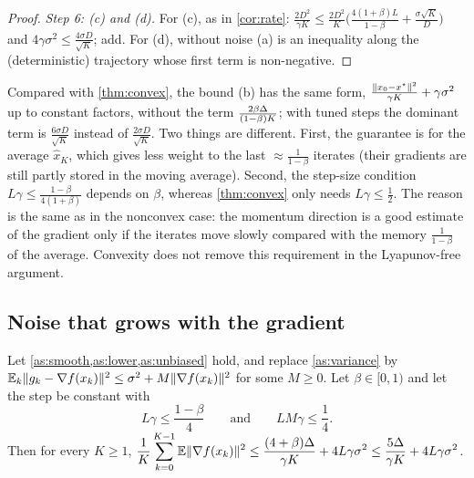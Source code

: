 \begin{proof}
\emph{Step 6: (c) and (d).} For (c), as in \cref{cor:rate}:
$\frac{2D^2}{\gamma K}\le\frac{2D^2}{K}\bigl(\frac{4(1+\beta)L}{1-\beta}+\frac{\sigma\sqrt K}{D}\bigr)$ and
$4\gamma\sigma^2\le\frac{4\sigma D}{\sqrt K}$; add. For (d), without noise (a) is an inequality
along the (deterministic) trajectory whose first term is non-negative.
\end{proof}

Compared with \cref{thm:convex}, the bound (b) has the same form,
$\frac{\lVert x_0-x^\star\rVert^2}{\gamma K}+\gamma\sigma^2$ up to constant factors, without the term
$\frac{2\beta\Delta}{(1-\beta)K}$; with tuned steps the dominant term is $\frac{6\sigma D}{\sqrt K}$
instead of $\frac{2\sigma D}{\sqrt K}$. Two things are different. First, the guarantee is for the
average $\hat x_K$, which gives less weight to the last $\approx\frac1{1-\beta}$ iterates
(their gradients are still partly stored in the moving average). Second, the step-size
condition $L\gamma\le\frac{1-\beta}{4(1+\beta)}$ depends on $\beta$, whereas \cref{thm:convex}
only needs $L\gamma\le\frac12$. The reason is the same as in the nonconvex case: the momentum
direction is a good estimate of the gradient only if the iterates move slowly compared with
the memory $\frac1{1-\beta}$ of the average. Convexity does not remove this requirement in
the Lyapunov-free argument.

\subsection{Noise that grows with the gradient}\label{sec:lf-growing}

\begin{proposition}\label{prop:lf-growing}
Let \cref{as:smooth,as:lower,as:unbiased} hold, and replace \cref{as:variance} by
$\mathbb{E}_k\lVert g_k-\nabla f(x_k)\rVert^2\le\sigma^2+M\lVert \nabla f(x_k)\rVert^2$ for some $M\ge0$. Let
$\beta\in[0,1)$ and let the step be constant with
\[
  L\gamma\le\frac{1-\beta}{4}\qquad\text{and}\qquad LM\gamma\le\frac14 .
\]
Then for every $K\ge1$,
$\displaystyle\frac1K\sum_{k=0}^{K-1}\mathbb{E}\lVert \nabla f(x_k)\rVert^2\le\frac{(4+\beta)\Delta}{\gamma K}+4L\gamma\sigma^2
\le\frac{5\Delta}{\gamma K}+4L\gamma\sigma^2$.
\end{proposition}

